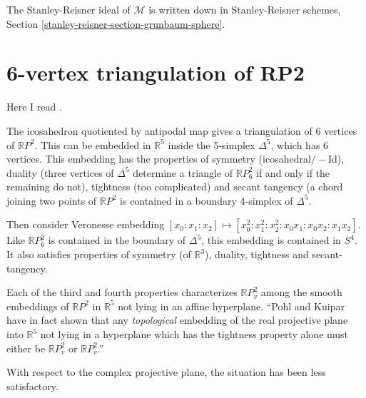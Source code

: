 The Stanley-Reisner ideal of $\mathcal{M}$ is
written down in Stanley-Reisner schemes,
Section
\ref{stanley-reisner-section-grunbaum-sphere}.

\section{6-vertex triangulation of RP2}
\label{section-6-vertex-triangulation-of-rp2}

\noindent
Here I read \cite{KuhnelBanchoff1983}.

\medskip\noindent
The icosahedron quotiented by antipodal
map gives a triangulation of 6 vertices
of $\mathbb{R}P^2$.
This can be embedded in $\mathbb{R}^5$ 
inside the 5-simplex $\Delta^5$,
which has 6 vertices.
This embedding has the properties
of symmetry (icosahedral$/-\text{Id}$),
duality (three vertices of $\Delta^5$
determine
a triangle of $\mathbb{R}P^2_6$ if and only
if
the remaining do not),
tightness (too complicated) and
secant tangency (a chord joining
two points of $\mathbb{R}P^2$ is contained
in a boundary 4-simplex of $\Delta^5$.

Then consider Veronesse embedding
$[x_0:x_1:x_2]\mapsto
[x_0^2:x_1^2:x_2^2:x_0x_1:x_0x_2:x_1x_2]$.
Like $\mathbb{R}P^2_6$ is contained in the
boundary of $\Delta^5$,
this embedding is contained in $S^4$.
It also satisfies properties of symmetry (of
$\mathbb{R}^3$),
duality, tightness and secant-tangency.

Each of the third and fourth properties
characterizes $\mathbb{R}P^2_v$ among
the smooth embeddings of $\mathbb{R}P^2$
in $\mathbb{R}^5$ not lying in an affine
hyperplane.
``Pohl and Kuipar have in fact shown that
any {\it topological} embedding of the real
projective plane into $\mathbb{R}^5$ not
lying in
a hyperplane which has the tightness property
alone must either be $\mathbb{R}P^2_v$ or
$\mathbb{R}P^2_v$.''

With respect to the complex projective plane,
the situation has been less satisfactory.






